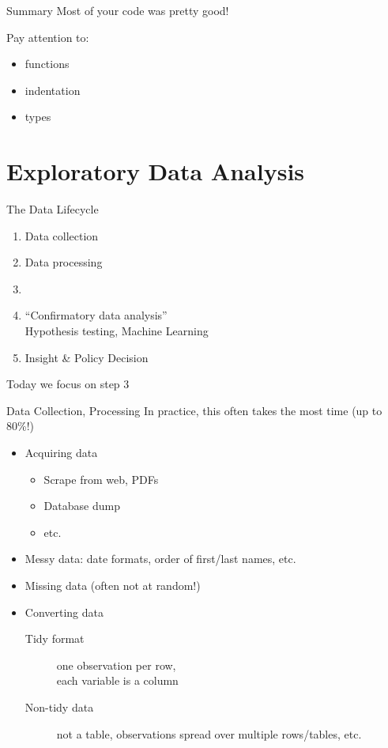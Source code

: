 \documentclass[aspectratio=169,usenames,dvipsnames]{beamer}
\begin{document}
\begin{frame}{Summary}
    Most of your code was pretty good!
    
    \vspace{1em}
    Pay attention to:
    \begin{itemize}
        \item functions
        \item indentation
        \item types
    \end{itemize}
\end{frame}


\section{Exploratory Data Analysis}
\frame{\tableofcontents[currentsection]}

\begin{frame}{The Data Lifecycle}
    \begin{enumerate}
        \item Data collection
        \item Data processing
        \item {}
        \item ``Confirmatory data analysis'' \\
            Hypothesis testing, Machine Learning
        \item Insight \& Policy Decision
    \end{enumerate}

    \vspace{1em}
    Today we focus on step 3
\end{frame}

\begin{frame}{Data Collection, Processing}
In practice, this often takes the most time (up to 80\%!)

\begin{itemize}
    \item Acquiring data
        \begin{itemize}
            \item Scrape from web, PDFs
            \item Database dump
            \item etc.
        \end{itemize}
    \item Messy data: date formats, order of first/last names, etc.
    \item Missing data (often not at random!)
    \item Converting data
        \begin{description}
            \item[Tidy format] one observation per row, \\
                    each variable is a column
            \item[Non-tidy data] not a table, observations spread over multiple
                rows/tables, etc.
        \end{description}
\end{itemize}
\end{frame}
\end{document}
